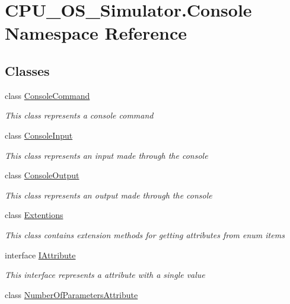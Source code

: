 \hypertarget{namespace_c_p_u___o_s___simulator_1_1_console}{}\section{C\+P\+U\+\_\+\+O\+S\+\_\+\+Simulator.\+Console Namespace Reference}
\label{namespace_c_p_u___o_s___simulator_1_1_console}
\subsection*{Classes}
\begin{DoxyCompactItemize}
\item 
class \hyperlink{class_c_p_u___o_s___simulator_1_1_console_1_1_console_command}{Console\+Command}
\begin{DoxyCompactList}\small\item\em This class represents a console command \end{DoxyCompactList}\item 
class \hyperlink{class_c_p_u___o_s___simulator_1_1_console_1_1_console_input}{Console\+Input}
\begin{DoxyCompactList}\small\item\em This class represents an input made through the console \end{DoxyCompactList}\item 
class \hyperlink{class_c_p_u___o_s___simulator_1_1_console_1_1_console_output}{Console\+Output}
\begin{DoxyCompactList}\small\item\em This class represents an output made through the console \end{DoxyCompactList}\item 
class \hyperlink{class_c_p_u___o_s___simulator_1_1_console_1_1_extentions}{Extentions}
\begin{DoxyCompactList}\small\item\em This class contains extension methods for getting attributes from enum items \end{DoxyCompactList}\item 
interface \hyperlink{interface_c_p_u___o_s___simulator_1_1_console_1_1_i_attribute}{I\+Attribute}
\begin{DoxyCompactList}\small\item\em This interface represents a attribute with a single value \end{DoxyCompactList}\item 
class \hyperlink{class_c_p_u___o_s___simulator_1_1_console_1_1_number_of_parameters_attribute}{Number\+Of\+Parameters\+Attribute}
\end{DoxyCompactItemize}
